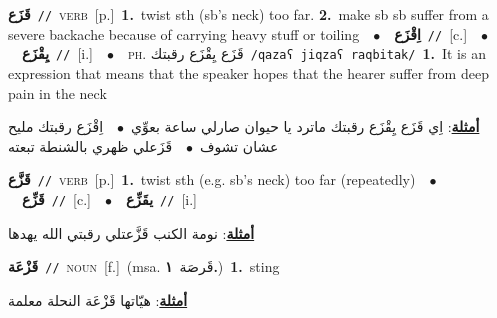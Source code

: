 \documentclass[10pt,a4paper,twoside]{article} %
\begin{document}
\begin{multicols}{2}
{\setlength\topsep{0pt}\textbf{\foreignlanguage{arabic}{قَزَع}}\ {\color{gray}\texttt{//}\color{black}}\ \textsc{verb}\ [p.]\ \textbf{1.}~twist  sth (sb's neck) too far.  \textbf{2.}~make sb sb suffer from a severe backache because of carrying heavy stuff or toiling\ \ $\bullet$\ \ \setlength\topsep{0pt}\textbf{\foreignlanguage{arabic}{اِقْزَع}}\ {\color{gray}\texttt{//}\color{black}}\ [c.]\ \ $\bullet$\ \ \setlength\topsep{0pt}\textbf{\foreignlanguage{arabic}{يِقْزَع}}\ {\color{gray}\texttt{//}\color{black}}\ [i.]\ \ $\bullet$\ \ \textsc{ph.} \color{gray} \foreignlanguage{arabic}{قَزَع يِقْزَع رقبتك}\color{black}\ {\color{gray}\texttt{/{\sffamily qazaʕ jiqzaʕ raqbitak}/}\color{black}}\ \textbf{1.}~It is an expression that means that the speaker hopes that the hearer suffer from deep pain in the neck\  \begin{flushright}\color{gray}\foreignlanguage{arabic}{\textbf{\underline{\foreignlanguage{arabic}{أمثلة}}}: اِي قَزَع يِقْزَع رقبتك ماترد يا حيوان صارلي ساعة بعوِّي\ $\bullet$\ \  اِقْزَع رقبتك مليح عشان تشوف\ $\bullet$\ \  قَزَعلي ظهري بالشنطة تبعته}\end{flushright}\color{black}} \vspace{2mm}

{\setlength\topsep{0pt}\textbf{\foreignlanguage{arabic}{قَزَّع}}\ {\color{gray}\texttt{//}\color{black}}\ \textsc{verb}\ [p.]\ \textbf{1.}~twist  sth (e.g. sb's neck) too far (repeatedly)\ \ $\bullet$\ \ \setlength\topsep{0pt}\textbf{\foreignlanguage{arabic}{قَزِّع}}\ {\color{gray}\texttt{//}\color{black}}\ [c.]\ \ $\bullet$\ \ \setlength\topsep{0pt}\textbf{\foreignlanguage{arabic}{يقَزِّع}}\ {\color{gray}\texttt{//}\color{black}}\ [i.]\  \begin{flushright}\color{gray}\foreignlanguage{arabic}{\textbf{\underline{\foreignlanguage{arabic}{أمثلة}}}: نومة الكنب قَزَّعتلي رقبتي الله يهدها}\end{flushright}\color{black}} \vspace{2mm}

{\setlength\topsep{0pt}\textbf{\foreignlanguage{arabic}{قَزْعَة}}\ {\color{gray}\texttt{//}\color{black}}\ \textsc{noun}\ [f.]\ \color{gray}(msa. \foreignlanguage{arabic}{قَرصَة}~\foreignlanguage{arabic}{\textbf{١.}})\color{black}\ \textbf{1.}~sting\  \begin{flushright}\color{gray}\foreignlanguage{arabic}{\textbf{\underline{\foreignlanguage{arabic}{أمثلة}}}: هيّاتها قَزْعَة النحلة معلمة}\end{flushright}\color{black}} \vspace{2mm}


\end{multicols}
\end{document}
